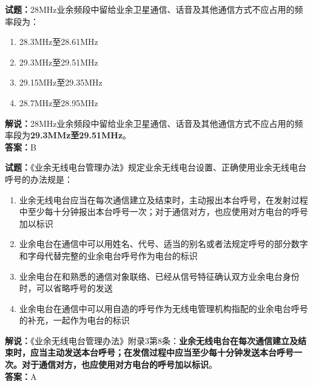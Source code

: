 \documentclass{ctexbook}
\begin{document}
\vspace{\baselineskip}

\noindent\textbf{试题：}28\unit{\MHz}业余频段中留给业余卫星通信、话音及其他通信方式不应占用的频率段为：
\begin{enumerate}[leftmargin=3em]
  \item 28.3\unit{\MHz}至28.61\unit{\MHz}
  \item 29.3\unit{\MHz}至29.51\unit{\MHz} %
  \item 29.15\unit{\MHz}至29.35\unit{\MHz}
  \item 28.7\unit{\MHz}至28.95\unit{\MHz}
\end{enumerate}
\noindent\textbf{解说：}28\unit{\MHz}业余频段中留给业余卫星通信、话音及其他通信方式不应占用的频率段为\textbf{29.3MMz至29.51\unit{\MHz}}。\\\noindent\textbf{答案：}B

\vspace{\baselineskip}

\noindent\textbf{试题：}《业余无线电台管理办法》规定业余无线电台设置、正确使用业余无线电台呼号的办法规是：
\begin{enumerate}[leftmargin=3em]
  \item 业余无线电台应当在每次通信建立及结束时，主动报出本台呼号，在发射过程中至少每十分钟报出本台呼号一次；对于通信对方，也应使用对方电台的呼号加以标识
  \item 业余电台在通信中可以用姓名、代号、适当的别名或者法规定呼号的部分数字和字母代替完整的业余电台呼号作为电台的标识
  \item 业余电台在和熟悉的通信对象联络、已经从信号特征确认双方业余电台身份时，可以省略呼号的发送
  \item 业余电台在通信中可以用自造的呼号作为无线电管理机构指配的业余电台呼号的补充，一起作为电台的标识
\end{enumerate}
\noindent\textbf{解说：}《业余无线电台管理办法》附录3第8条：\textbf{业余无线电台在每次通信建立及结束时，应当主动发送本台呼号；在发信过程中应当至少每十分钟发送本台呼号一次。对于通信对方，也应使用对方电台的呼号加以标识}。\\\noindent\textbf{答案：}A

\vspace{\baselineskip}
\end{document}
